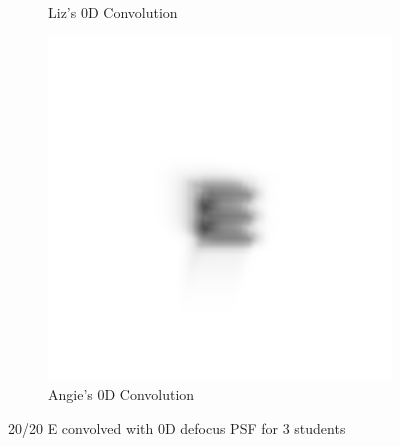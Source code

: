 \documentclass{article}
\begin{document}
\begin{figure}[H]
\begin{subfigure}{.3\textwidth}
  \caption{Liz's 0D Convolution}
  \label{fig:liz0d}
\end{subfigure}
\begin{subfigure}{.3\textwidth}
  \centering
  \includegraphics[width=1\linewidth]{Angie_R_0526_1_500_zer_0_5_PSF_convE.png}
  \caption{Angie's 0D Convolution}
  \label{fig:angie0d}
\end{subfigure}

\caption{20/20 E convolved with 0D defocus PSF for 3 students}
\label{fig:Defocus_0D}
\end{figure}

\clearpage
\end{document}
